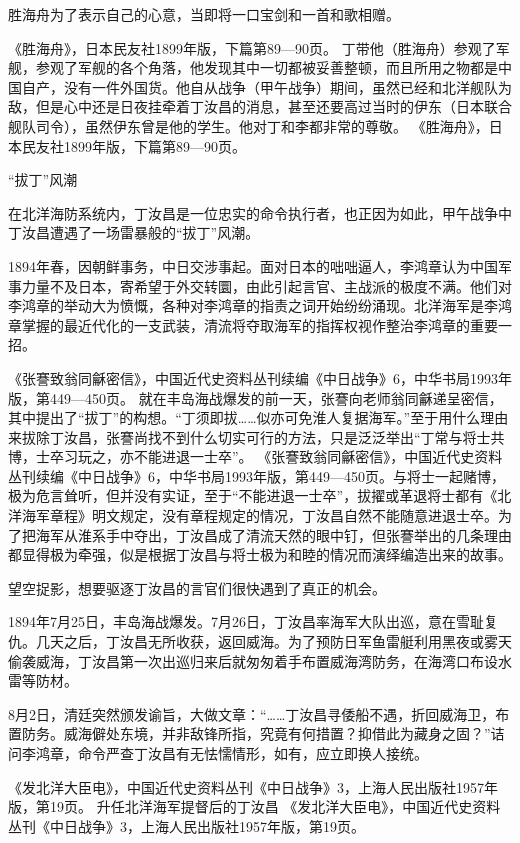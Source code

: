 \documentclass[12pt,UTF8]{ctexbook}
\begin{document}
胜海舟为了表示自己的心意，当即将一口宝剑和一首和歌相赠。

《胜海舟》，日本民友社1899年版，下篇第89—90页。
丁带他（胜海舟）参观了军舰，参观了军舰的各个角落，他发现其中一切都被妥善整顿，而且所用之物都是中国自产，没有一件外国货。他自从战争（甲午战争）期间，虽然已经和北洋舰队为敌，但是心中还是日夜挂牵着丁汝昌的消息，甚至还要高过当时的伊东（日本联合舰队司令），虽然伊东曾是他的学生。他对丁和李都非常的尊敬。 《胜海舟》，日本民友社1899年版，下篇第89—90页。

“拔丁”风潮

在北洋海防系统内，丁汝昌是一位忠实的命令执行者，也正因为如此，甲午战争中丁汝昌遭遇了一场雷暴般的“拔丁”风潮。

1894年春，因朝鲜事务，中日交涉事起。面对日本的咄咄逼人，李鸿章认为中国军事力量不及日本，寄希望于外交转圜，由此引起言官、主战派的极度不满。他们对李鸿章的举动大为愤慨，各种对李鸿章的指责之词开始纷纷涌现。北洋海军是李鸿章掌握的最近代化的一支武装，清流将夺取海军的指挥权视作整治李鸿章的重要一招。

《张謇致翁同龢密信》，中国近代史资料丛刊续编《中日战争》6，中华书局1993年版，第449—450页。
就在丰岛海战爆发的前一天，张謇向老师翁同龢递呈密信，其中提出了“拔丁”的构想。“丁须即拔……似亦可免淮人复据海军。”至于用什么理由来拔除丁汝昌，张謇尚找不到什么切实可行的方法，只是泛泛举出“丁常与将士共博，士卒习玩之，亦不能进退一士卒”。 《张謇致翁同龢密信》，中国近代史资料丛刊续编《中日战争》6，中华书局1993年版，第449—450页。与将士一起赌博，极为危言耸听，但并没有实证，至于“不能进退一士卒”，拔擢或革退将士都有《北洋海军章程》明文规定，没有章程规定的情况，丁汝昌自然不能随意进退士卒。为了把海军从淮系手中夺出，丁汝昌成了清流天然的眼中钉，但张謇举出的几条理由都显得极为牵强，似是根据丁汝昌与将士极为和睦的情况而演绎编造出来的故事。

望空捉影，想要驱逐丁汝昌的言官们很快遇到了真正的机会。

1894年7月25日，丰岛海战爆发。7月26日，丁汝昌率海军大队出巡，意在雪耻复仇。几天之后，丁汝昌无所收获，返回威海。为了预防日军鱼雷艇利用黑夜或雾天偷袭威海，丁汝昌第一次出巡归来后就匆匆着手布置威海湾防务，在海湾口布设水雷等防材。

8月2日，清廷突然颁发谕旨，大做文章：“……丁汝昌寻倭船不遇，折回威海卫，布置防务。威海僻处东境，并非敌锋所指，究竟有何措置？抑借此为藏身之固？”诘问李鸿章，命令严查丁汝昌有无怯懦情形，如有，应立即换人接统。


《发北洋大臣电》，中国近代史资料丛刊《中日战争》3，上海人民出版社1957年版，第19页。
升任北洋海军提督后的丁汝昌 《发北洋大臣电》，中国近代史资料丛刊《中日战争》3，上海人民出版社1957年版，第19页。
\end{document}
